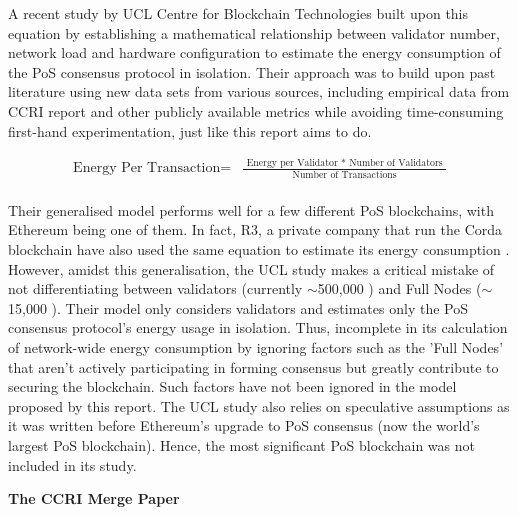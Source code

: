 A recent study by UCL Centre for Blockchain Technologies \cite{PlattDiscussionProof-of-Work} built upon this equation by establishing a mathematical relationship between validator number, network load and hardware configuration to estimate the energy consumption of the PoS consensus protocol in isolation. Their approach was to build upon past literature using new data sets from various sources, including empirical data from CCRI report \cite{CryptoCarbonRatingsInstitute2022TheNetwork} and other publicly available metrics while avoiding time-consuming first-hand experimentation, just like this report aims to do. 

\begin{align}
   \boldsymbol{\mathrm{\text{Energy Per Transaction} = }}
   &\boldsymbol{\mathrm{\frac{\text{ Energy per Validator }* \text{ Number of Validators } }{\text{ Number of Transactions }}} } \nonumber\\ \nonumber
\end{align}

Their generalised model performs well for a few different PoS blockchains, with Ethereum being one of them. In fact, R3, a private company that run the Corda blockchain have also used the same equation to estimate its energy consumption \cite{JustBlog}. However, amidst this generalisation, the UCL study makes a critical mistake of not differentiating between validators (currently $\sim$500,000 \cite{EthereumEthereum.orgc}) and Full Nodes ($\sim$15,000 \cite{NodewatchAnalytics}). Their model only considers validators and estimates only the PoS consensus protocol’s energy usage in isolation. Thus, incomplete in its calculation of network-wide energy consumption by ignoring factors such as the 'Full Nodes' that aren't actively participating in forming consensus but greatly contribute to securing the blockchain. Such factors have not been ignored in the model proposed by this report. The UCL study also relies on speculative assumptions as it was written before Ethereum’s upgrade to PoS consensus (now the world’s largest PoS blockchain). Hence, the most significant PoS blockchain was not included in its study.


\textbf{The CCRI Merge Paper } \cite{CryptoCarbonRatingsInstitute2022TheNetwork}

